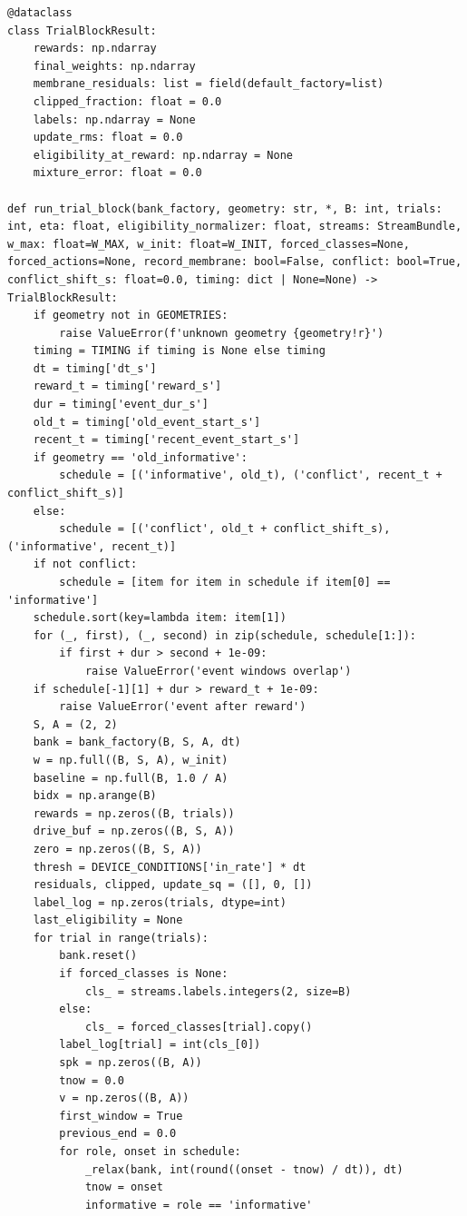 \documentclass[a4paper,10pt]{article}
\begin{document}
\begin{Verbatim}
@dataclass
class TrialBlockResult:
    rewards: np.ndarray
    final_weights: np.ndarray
    membrane_residuals: list = field(default_factory=list)
    clipped_fraction: float = 0.0
    labels: np.ndarray = None
    update_rms: float = 0.0
    eligibility_at_reward: np.ndarray = None
    mixture_error: float = 0.0

def run_trial_block(bank_factory, geometry: str, *, B: int, trials: int, eta: float, eligibility_normalizer: float, streams: StreamBundle, w_max: float=W_MAX, w_init: float=W_INIT, forced_classes=None, forced_actions=None, record_membrane: bool=False, conflict: bool=True, conflict_shift_s: float=0.0, timing: dict | None=None) -> TrialBlockResult:
    if geometry not in GEOMETRIES:
        raise ValueError(f'unknown geometry {geometry!r}')
    timing = TIMING if timing is None else timing
    dt = timing['dt_s']
    reward_t = timing['reward_s']
    dur = timing['event_dur_s']
    old_t = timing['old_event_start_s']
    recent_t = timing['recent_event_start_s']
    if geometry == 'old_informative':
        schedule = [('informative', old_t), ('conflict', recent_t + conflict_shift_s)]
    else:
        schedule = [('conflict', old_t + conflict_shift_s), ('informative', recent_t)]
    if not conflict:
        schedule = [item for item in schedule if item[0] == 'informative']
    schedule.sort(key=lambda item: item[1])
    for (_, first), (_, second) in zip(schedule, schedule[1:]):
        if first + dur > second + 1e-09:
            raise ValueError('event windows overlap')
    if schedule[-1][1] + dur > reward_t + 1e-09:
        raise ValueError('event after reward')
    S, A = (2, 2)
    bank = bank_factory(B, S, A, dt)
    w = np.full((B, S, A), w_init)
    baseline = np.full(B, 1.0 / A)
    bidx = np.arange(B)
    rewards = np.zeros((B, trials))
    drive_buf = np.zeros((B, S, A))
    zero = np.zeros((B, S, A))
    thresh = DEVICE_CONDITIONS['in_rate'] * dt
    residuals, clipped, update_sq = ([], 0, [])
    label_log = np.zeros(trials, dtype=int)
    last_eligibility = None
    for trial in range(trials):
        bank.reset()
        if forced_classes is None:
            cls_ = streams.labels.integers(2, size=B)
        else:
            cls_ = forced_classes[trial].copy()
        label_log[trial] = int(cls_[0])
        spk = np.zeros((B, A))
        tnow = 0.0
        v = np.zeros((B, A))
        first_window = True
        previous_end = 0.0
        for role, onset in schedule:
            _relax(bank, int(round((onset - tnow) / dt)), dt)
            tnow = onset
            informative = role == 'informative'

\end{Verbatim}
\end{document}
